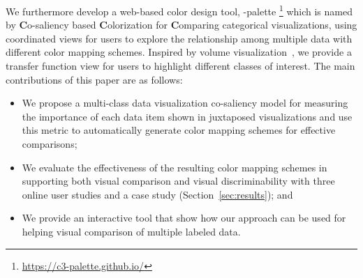 We furthermore develop a web-based color design tool, \toolname-palette \footnote{\small \url{https://c3-palette.github.io/}} which is named by \textbf{C}o-saliency based \textbf{C}olorization for \textbf{C}omparing categorical visualizations, using coordinated views for users to explore the relationship among multiple data with different color mapping schemes. Inspired by volume visualization~\cite{kindlmann1998semi}, we provide a transfer function view for users to highlight different classes of interest.
The main contributions of this paper are as follows:
\begin{itemize}[noitemsep]
\setlength{\itemsep}{5pt}
  \item We propose a multi-class data visualization co-saliency model for measuring the importance of each data item shown in juxtaposed visualizations and use this metric to automatically generate color mapping schemes for effective comparisons;

  \item
   We evaluate the effectiveness of the resulting color mapping schemes in supporting both visual comparison and visual discriminability with three online user studies and a case study (Section~\ref{sec:results}); and
   
     \item
  We provide an interactive tool that show how our approach can be used for helping visual comparison of multiple labeled data.
\end{itemize}

